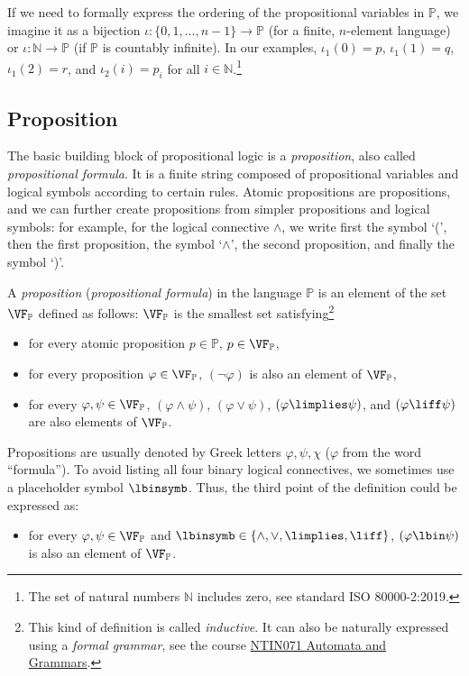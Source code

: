 \begin{remark}\label{remark:order-of-language}
If we need to formally express the ordering of the propositional variables in $\mathbb P$, we imagine it as a bijection $\iota\colon\{0, 1, \dots, n-1\}\to \mathbb P$ (for a finite, $n$-element language) or $\iota\colon\mathbb{N}\to \mathbb P$ (if $\mathbb P$ is countably infinite). In our examples, $\iota_1(0)=p$, $\iota_1(1)=q$, $\iota_1(2)=r$, and $\iota_2(i)=p_i$ for all $i\in\mathbb{N}$.\footnote{The set of natural numbers $\mathbb{N}$ includes zero, see standard ISO 80000-2:2019.}
\end{remark}

\subsection{Proposition}

The basic building block of propositional logic is a \emph{proposition}, also called \emph{propositional formula}. It is a finite string composed of propositional variables and logical symbols according to certain rules. Atomic propositions are propositions, and we can further create propositions from simpler propositions and logical symbols: for example, for the logical connective $\land$, we write first the symbol `(', then the first proposition, the symbol `$\land$', the second proposition, and finally the symbol `)'.
\begin{definition}[Proposition]\label{definition:proposition}
    A \emph{proposition} (\emph{propositional formula}) in the language $\mathbb P$ is an element of the set $\VF_\mathbb P$ defined as follows: $\VF_\mathbb P$ is the smallest set satisfying\footnote{This kind of definition is called \emph{inductive}. It can also be naturally expressed using a \emph{formal grammar}, see the course \href{https://is.cuni.cz/studium/predmety/index.php?do=predmet&kod=NTIN071}{NTIN071 Automata and Grammars}.}
    \begin{itemize}
        \item for every atomic proposition $p\in\mathbb P$, $p\in\VF_\mathbb P$,
        \item for every proposition $\varphi\in\VF_\mathbb P$, $(\neg\varphi)$ is also an element of $\VF_\mathbb P$,
        \item for every $\varphi,\psi\in\VF_\mathbb P$, $(\varphi\land\psi)$, $(\varphi\lor\psi)$, $(\varphi\limplies\psi)$, and $(\varphi\liff\psi)$ are also elements of $\VF_\mathbb P$.
    \end{itemize}        
\end{definition}
Propositions are usually denoted by Greek letters $\varphi, \psi, \chi$ ($\varphi$ from the word ``formula''). To avoid listing all four binary logical connectives, we sometimes use a placeholder symbol $\lbinsymb$. Thus, the third point of the definition could be expressed as:
\begin{itemize}
    \item for every $\varphi,\psi\in\VF_\mathbb P$ and $\lbinsymb\in\{\land, \lor, \limplies, \liff\}$, $(\varphi\lbin\psi)$ is also an element of $\VF_\mathbb P$.
\end{itemize}  

